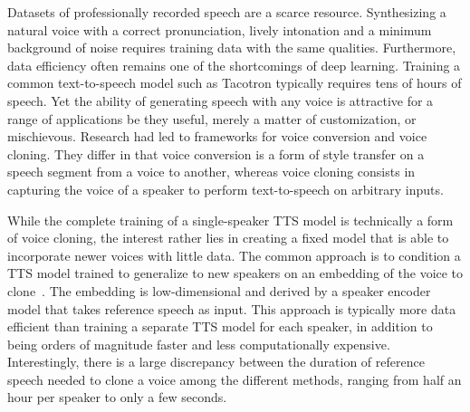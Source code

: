 \documentclass[a4paper, oneside, 12pt, english]{article}
\begin{document}
Datasets of professionally recorded speech are a scarce resource. Synthesizing a natural voice with a correct pronunciation, lively intonation and a minimum background of noise requires training data with the same qualities. Furthermore, data efficiency often remains one of the shortcomings of deep learning. Training a common text-to-speech model such as Tacotron \citep{Tacotron1} typically requires tens of hours of speech. %
Yet the ability of generating speech with any voice is attractive for a range of applications be they useful, merely a matter of customization, or mischievous. Research had led to frameworks for voice conversion and voice cloning. They differ in that voice conversion is a form of style transfer on a speech segment from a voice to another, whereas voice cloning consists in capturing the voice of a speaker to perform text-to-speech on arbitrary inputs. 

While the complete training of a single-speaker TTS model is technically a form of voice cloning, the interest rather lies in creating a fixed model that is able to incorporate newer voices with little data. The common approach is to condition a TTS model trained to generalize to new speakers on an embedding of the voice to clone~\citep{DeepVoice2, CloningFewSamples, SV2TTS}. The embedding is low-dimensional and derived by a speaker encoder model that takes reference speech as input. This approach is typically more data efficient than training a separate TTS model for each speaker, in addition to being orders of magnitude faster and less computationally expensive. Interestingly, there is a large discrepancy between the duration of reference speech needed to clone a voice among the different methods, ranging from half an hour per speaker to only a few seconds.

\end{document}
